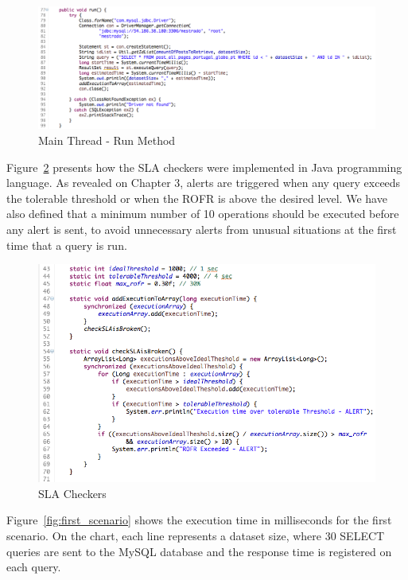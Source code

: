 \begin{figure}[ht!]
\centering
\includegraphics[width=150mm]{Imagens/core-execution-01-2.png}
\caption{Main Thread - Run Method \label{fig:core-execution-01.2}}
\end{figure}


Figure~\ref{fig:core-execution-01.3} presents how the SLA checkers were implemented in Java programming language. As revealed on Chapter 3, alerts are triggered when any query exceeds the tolerable threshold or when the ROFR is above the desired level. We have also defined that a minimum number of 10 operations should be executed before any alert is sent, to avoid unnecessary alerts from unusual situations at the first time that a query is run.

\begin{figure}[ht!]
\centering
\includegraphics[width=120mm]{Imagens/core-execution-01-3.png}
\caption{SLA Checkers \label{fig:core-execution-01.3}}
\end{figure}


Figure~\ref{fig:first_scenario} shows the execution time in milliseconds for the first scenario. On the chart, each line represents a dataset size, where 30 SELECT queries are sent to the MySQL database and the response time is registered on each query.

